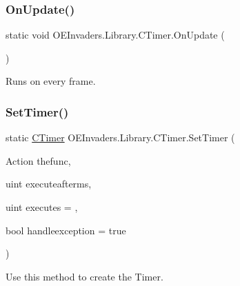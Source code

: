 \mbox{\label{class_o_e_invaders_1_1_library_1_1_c_timer_a81722581ec5aee35dadfff0ed6a1839e}} 
\subsubsection{\texorpdfstring{OnUpdate()}{OnUpdate()}}
{\footnotesize\ttfamily static void O\+E\+Invaders.\+Library.\+C\+Timer.\+On\+Update (\begin{DoxyParamCaption}{ }\end{DoxyParamCaption})\hspace{0.3cm}{\ttfamily [static]}}



Runs on every frame. 

\mbox{\label{class_o_e_invaders_1_1_library_1_1_c_timer_ac03393ba60d4802cad27553e8d399559}} 
\subsubsection{\texorpdfstring{SetTimer()}{SetTimer()}}
{\footnotesize\ttfamily static \mbox{\hyperlink{class_o_e_invaders_1_1_library_1_1_c_timer}{C\+Timer}} O\+E\+Invaders.\+Library.\+C\+Timer.\+Set\+Timer (\begin{DoxyParamCaption}\item[{Action}]{thefunc,  }\item[{uint}]{executeafterms,  }\item[{uint}]{executes = {},  }\item[{bool}]{handleexception = {\ttfamily true} }\end{DoxyParamCaption})\hspace{0.3cm}{\ttfamily [static]}}



Use this method to create the Timer. 


